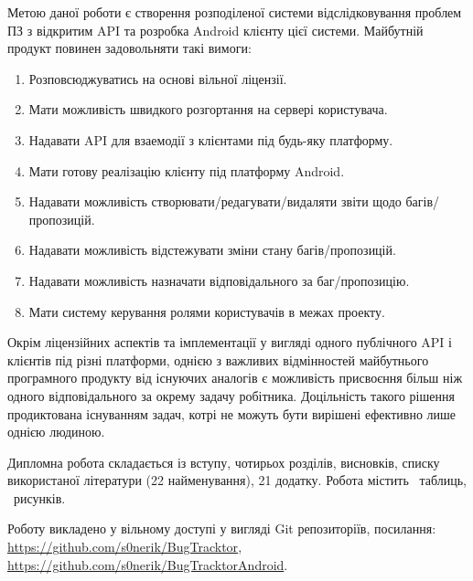 \documentclass[../main.tex]{subfiles}
\begin{document}
Метою даної роботи є створення розподіленої системи відслідковування проблем ПЗ з відкритим API та розробка Android клієнту цієї системи. Майбутній продукт повинен задовольняти такі вимоги:
\begin{enumerate}
\item Розповсюджуватись на основі вільної ліцензії.
\item Мати можливість швидкого розгортання на сервері користувача.
\item Надавати API для взаемодії з клієнтами під будь-яку платформу.
\item Мати готову реалізацію клієнту під платформу Android.
\item Надавати можливість створювати/редагувати/видаляти звіти щодо багів/пропозицій.
\item Надавати можливість відстежувати зміни стану багів/пропозицій.
\item Надавати можливість назначати відповідального за баг/пропозицію.
\item Мати систему керування ролями користувачів в межах проекту.
\end{enumerate}

Окрім ліцензійних аспектів та імплементації у вигляді одного публічного API і клієнтів під різні платформи, однією з важливих відмінностей майбутнього програмного продукту від існуючих аналогів є можливість присвоєння більш ніж одного відповідального за окрему задачу робітника. Доцільність такого рішення продиктована існуванням задач, котрі не можуть бути вирішені ефективно лише однією людиною.

Дипломна робота складається із вступу, чотирьох розділів, висновків, списку використаної літератури (22 найменування), 21 додатку. Робота містить \totaltables\ таблиць, \totalfigures\  рисунків.

Роботу викладено у вільному доступі у вигляді Git репозиторіїв, посилання: \url{https://github.com/s0nerik/BugTracktor}, \url{https://github.com/s0nerik/BugTracktorAndroid}.
\end{document}
